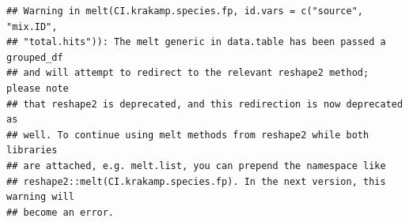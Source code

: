 \documentclass[
]{article}
\newenvironment{Shaded}{\begin{snugshade}}{\end{snugshade}}
\newcommand{\CommentTok}[1]{\textcolor[rgb]{0.56,0.35,0.01}{\textit{#1}}}
\newcommand{\DataTypeTok}[1]{\textcolor[rgb]{0.13,0.29,0.53}{#1}}
\newcommand{\KeywordTok}[1]{\textcolor[rgb]{0.13,0.29,0.53}{\textbf{#1}}}
\newcommand{\NormalTok}[1]{#1}
\newcommand{\OperatorTok}[1]{\textcolor[rgb]{0.81,0.36,0.00}{\textbf{#1}}}
\newcommand{\StringTok}[1]{\textcolor[rgb]{0.31,0.60,0.02}{#1}}
\begin{document}
\begin{Shaded}
\end{Shaded}

\begin{verbatim}
## Warning in melt(CI.krakamp.species.fp, id.vars = c("source", "mix.ID",
## "total.hits")): The melt generic in data.table has been passed a grouped_df
## and will attempt to redirect to the relevant reshape2 method; please note
## that reshape2 is deprecated, and this redirection is now deprecated as
## well. To continue using melt methods from reshape2 while both libraries
## are attached, e.g. melt.list, you can prepend the namespace like
## reshape2::melt(CI.krakamp.species.fp). In the next version, this warning will
## become an error.
\end{verbatim}

\begin{Shaded}
\end{Shaded}
\end{document}
